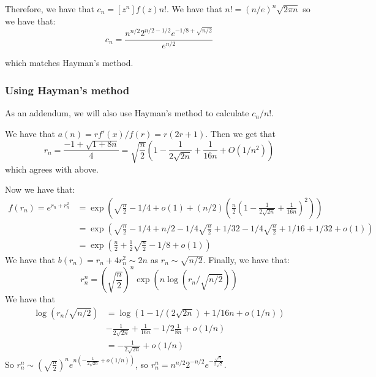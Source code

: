 \documentclass[]{article}
\begin{document}
Therefore, we have that $c_n = [z^n] f(z) n!$. We have that $n! = (n/e)^n \sqrt{2 \pi n}$
so we have that:
\begin{equation}
	c_n = \frac{n^{n/2} 2^{n/2 - 1/2} e^{-1/8 + \sqrt{n/2}} }{ e^{n/2}}
\end{equation}

which matches Hayman's method. 

\subsubsection{Using Hayman's method}
As an addendum, we will also use Hayman's method to calculate $c_n/n!$. 


We have that $a(n) = r f'(x)/f(r) = r(2r + 1)$. Then we get that 
\begin{equation}
	r_n = \frac{-1 + \sqrt{1 + 8n}}{4} = \sqrt{\frac{n}{2}} \left(1 - \frac{1}{2 \sqrt{2n}} + \frac{1}{16n} + O(1/n^2)\right)
\end{equation}
which agrees with above. 

Now we have that:
\begin{align*}
	f(r_n) = e^{r_n + r_n^2} &= \exp\left(\sqrt{\frac{n}{2}} - 1/4 + o(1) + (n/2)\left(\frac{n}{2} \left(1 - \frac{1}{2 \sqrt{2n}} + \frac{1}{16n}\right) ^2 \right)\right)\\
	&=
	\exp \left(
	\sqrt{\frac{n}{2}} - 1/4 + n/2 - 1/4\sqrt{\frac{n}{2}} + 1/32 - 1/4\sqrt{\frac{n}{2}} + 1/16 + 1/32 + o(1)
	\right)\\
	&=
	\exp \left(
	\frac{n}{2} + \frac{1}{2} \sqrt{\frac{n}{2}} - 1/8 + o(1)
	\right)
\end{align*}
We have that $b(r_n) = r_n + 4 r_n^2 \sim 2n$ as $r_n \sim \sqrt{n/2}$. Finally, we have that:
\begin{equation}
	r_n^n = \left(\sqrt{\frac{n}{2}}\right)^n  \exp( n  \log(r_n/ \sqrt{n/2}))
\end{equation}
We have that 
\begin{align*}
	\log(r_n/\sqrt{n/2}) &= \log(1 - 1/(2 \sqrt{2n}) + 1/16n + o(1/n))\\
	& -\frac{1}{2 \sqrt{2n}} + \frac{1}{16n} - 1/2 \frac{1}{8n} + o(1/n)\\
	&= - \frac{1}{2 \sqrt{2n}} + o(1/n)
\end{align*}
So $r_n^n \sim \left(\sqrt{\frac{n}{2}}\right)^n e^{n \left(- \frac{1}{2 \sqrt{2n}} + o(1/n)\right)}$, so $r_n^n = n^{n/2} 2^{-n/2} e^{-\frac{\sqrt{n}}{2\sqrt{2}}}$. 
\end{document}
